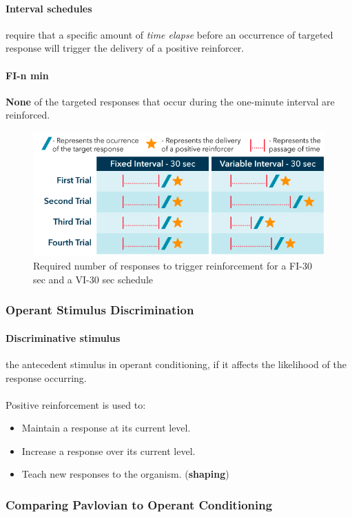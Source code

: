 \documentclass{article}
\begin{document}
	\paragraph{Interval schedules} require that a specific amount of \emph{time elapse} before an occurrence of targeted response will trigger the delivery of a positive reinforcer.
	\paragraph{FI-n min} \textbf{None} of the targeted responses that occur during the one-minute interval are reinforced.
	\begin{figure}
		\centering
		\includegraphics[width = \linewidth ]{pic/reinforcing_interval}
		\caption{Required number of responses to trigger reinforcement for a FI-30 sec and a VI-30 sec schedule}
	\end{figure}
	\subsubsection{Operant Stimulus Discrimination}
	\paragraph{Discriminative stimulus} the antecedent stimulus in operant conditioning, if it affects the likelihood of the response occurring.
	\paragraph{} Positive reinforcement is used to:
	\begin{itemize}
		\item Maintain a response at its current level.
		\item Increase a response over its current level.
		\item Teach new responses to the organism. (\textbf{shaping})
	\end{itemize}
	\subsubsection{Comparing Pavlovian to Operant Conditioning}
\end{document}
